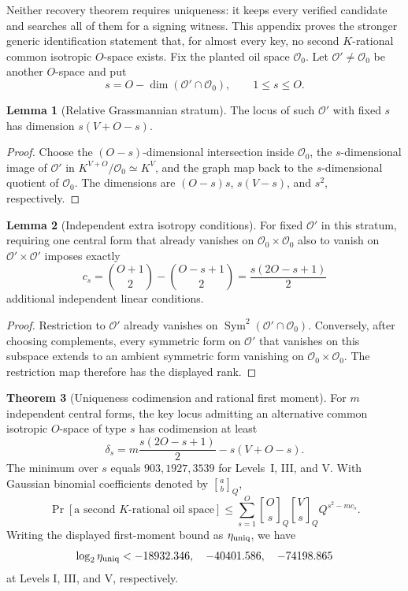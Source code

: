 \documentclass[11pt,a4paper]{article}
\theoremstyle{definition}
\newtheorem{theorem}{Theorem}[section]
\newtheorem{lemma}[theorem]{Lemma}
\theoremstyle{remark}
\newcommand{\cO}{\mathcal O}
\newcommand{\Sym}{\operatorname{Sym}}
\begin{document}
Neither recovery theorem requires uniqueness: it keeps every verified candidate and searches all of them for a signing witness.  This appendix proves the stronger generic identification statement that, for almost every key, no second $K$-rational common isotropic $O$-space exists.  Fix the planted oil space $\cO_0$.  Let $\cO'\ne\cO_0$ be another $O$-space and put
\[
s=O-\dim(\cO'\cap\cO_0),\qquad 1\le s\le O.
\]

\begin{lemma}[Relative Grassmannian stratum]\label{lem:relative-grassmann}
The locus of such $\cO'$ with fixed $s$ has dimension $s(V+O-s)$.
\end{lemma}

\begin{proof}
Choose the $(O-s)$-dimensional intersection inside $\cO_0$, the $s$-dimensional image of $\cO'$ in $K^{V+O}/\cO_0\simeq K^V$, and the graph map back to the $s$-dimensional quotient of $\cO_0$.  The dimensions are $(O-s)s$, $s(V-s)$, and $s^2$, respectively.
\end{proof}

\begin{lemma}[Independent extra isotropy conditions]\label{lem:extra-isotropy}
For fixed $\cO'$ in this stratum, requiring one central form that already vanishes on $\cO_0\times\cO_0$ also to vanish on $\cO'\times\cO'$ imposes exactly
\[
c_s=\binom{O+1}{2}-\binom{O-s+1}{2}=\frac{s(2O-s+1)}2
\]
additional independent linear conditions.
\end{lemma}

\begin{proof}
Restriction to $\cO'$ already vanishes on $\Sym^2(\cO'\cap\cO_0)$.  Conversely, after choosing complements, every symmetric form on $\cO'$ that vanishes on this subspace extends to an ambient symmetric form vanishing on $\cO_0\times\cO_0$.  The restriction map therefore has the displayed rank.
\end{proof}

\begin{theorem}[Uniqueness codimension and rational first moment]\label{thm:uniqueness}
For $m$ independent central forms, the key locus admitting an alternative common isotropic $O$-space of type $s$ has codimension at least
\[
\delta_s=m\frac{s(2O-s+1)}2-s(V+O-s).
\]
The minimum over $s$ equals $903,1927,3539$ for Levels~I, III, and V.  With Gaussian binomial coefficients denoted by $\genfrac{[}{]}{0pt}{}{a}{b}_Q$,
\[
\Pr[\text{a second $K$-rational oil space}]
\le
\sum_{s=1}^{O}
\genfrac{[}{]}{0pt}{}{O}{s}_Q
\genfrac{[}{]}{0pt}{}{V}{s}_Q
Q^{s^2-mc_s}.
\]
Writing the displayed first-moment bound as $\eta_{\rm uniq}$, we have
\[
\log_2\eta_{\rm uniq}<-18932.346,\quad -40401.586,\quad -74198.865
\]
at Levels I, III, and V, respectively.
\end{theorem}
\end{document}
